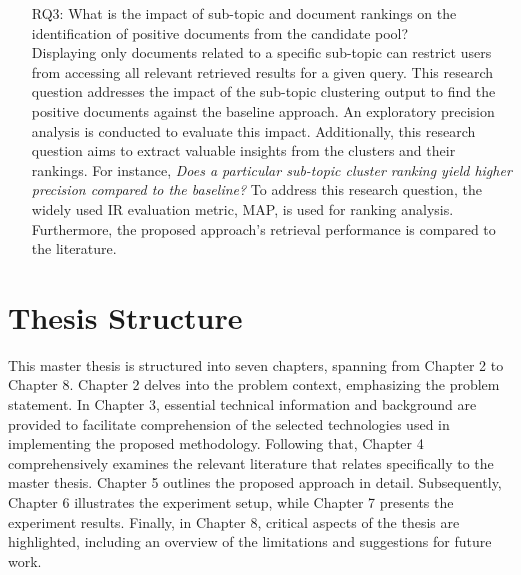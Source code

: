\begin{enumerate}
\item[RQ3:] What is the impact of sub-topic and document rankings on the identification of positive documents from the candidate pool? \\

Displaying only documents related to a specific sub-topic can restrict users from accessing all relevant retrieved results for a given query. This research question addresses the impact of the sub-topic clustering output to find the positive documents against the baseline approach. An exploratory precision analysis is conducted to evaluate this impact. Additionally, this research question aims to extract valuable insights from the clusters and their rankings. For instance, \textit{Does a particular sub-topic cluster ranking yield higher precision compared to the baseline?} To address this research question, the widely used \ac{IR} evaluation metric, \ac{MAP}, is used for ranking analysis. Furthermore, the proposed approach's retrieval performance is compared to the literature.

\end{enumerate}


\section{Thesis Structure}

This master thesis is structured into seven chapters, spanning from Chapter 2 to Chapter 8. Chapter 2 delves into the problem context, emphasizing the problem statement. In Chapter 3, essential technical information and background are provided to facilitate comprehension of the selected technologies used in implementing the proposed methodology. Following that, Chapter 4 comprehensively examines the relevant literature that relates specifically to the master thesis. Chapter 5 outlines the proposed approach in detail. Subsequently, Chapter 6 illustrates the experiment setup, while Chapter 7 presents the experiment results. Finally, in Chapter 8, critical aspects of the thesis are highlighted, including an overview of the limitations and suggestions for future work.



